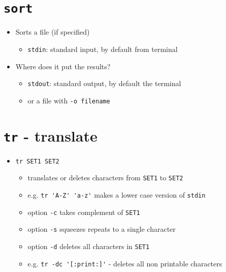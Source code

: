 \documentclass{article}
\begin{document}
\section{\texttt{sort}}
\begin{itemize}
\item Sorts a file (if specified)
\begin{itemize}
\item \verb!stdin!: standard input, by default from terminal
\end{itemize}
\item Where does it put the results? 
\begin{itemize}
\item \verb!stdout!: standard output, by default the terminal
\item or a file with \verb!-o filename!
\end{itemize}
\end{itemize}



\section{\texttt{tr} - translate}
\begin{itemize}
\item \verb!tr SET1 SET2!
\begin{itemize}
\item translates or deletes characters from \verb!SET1! to \verb!SET2!
\item e.g. \verb!tr 'A-Z' 'a-z'! makes a lower case version of \verb!stdin!
\item option \verb!-c! takes complement of \verb!SET1!
\item option \verb!-s! squeezes repeats to a single character
\item option \verb!-d! deletes all characters in \verb!SET1!
\item e.g. \verb!tr -dc '[:print:]'! - deletes all non printable characters
\end{itemize}
\end{itemize}
\end{document}
